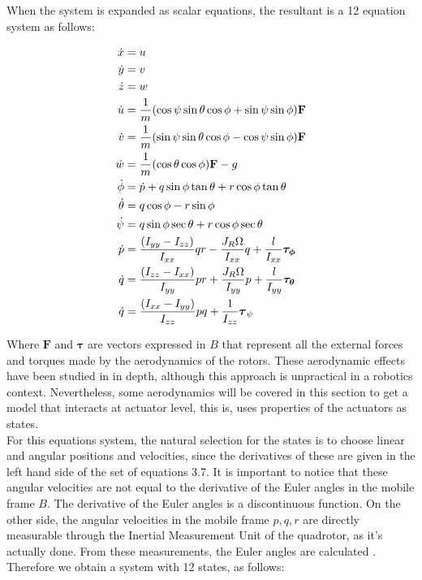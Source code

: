 When the system is expanded as scalar equations, the resultant is a 12 equation system as follows:

\begin{equation} 
\begin{subequations} \label{eq:newtonformulationexpanded}
\begin{align}
	\dot{x} &= u \label{first}\\
	\dot{y} &= v \label{second}\\
	\dot{z} &= w \label{third}\\
	\dot{u} &= \frac{1}{m}(\cos{\psi}\sin{\theta}\cos{\phi} + \sin{\psi}\sin{\phi})\mathbf{F} \label{fourth}\\
	\dot{v} &= \frac{1}{m}(\sin{\psi}\sin{\theta}\cos{\phi} - \cos{\psi}\sin{\phi})\mathbf{F} \label{fifth}\\
	\dot{w} &= \frac{1}{m}(\cos{\theta}\cos{\phi})\mathbf{F} - g\label{sixth}\\
	\dot{\phi} &= \dot{p} + q\sin{\phi}\tan{\theta} +r\cos{\phi}\tan{\theta} \label{seventh}\\
	\dot{\theta} &=  q\cos{\phi} - r\sin{\phi}\label{eighth}\\
	\dot{\psi} &= q\sin{\phi}\sec{\theta} + r\cos{\phi}\sec{\theta}\label{nineth}\\
	\dot{p} &= \frac{(I_{yy} - I_{zz})}{I_{xx}}qr - \frac{J_R\Omega}{I_{xx}}q + \frac{l}{I_{xx}}\boldsymbol{\tau_{\phi}}\label{tenth}\\
	\dot{q} &= \frac{(I_{zz} - I_{xx})}{I_{yy}}pr + \frac{J_R\Omega}{I_{yy}}p + \frac{l}{I_{yy}}\boldsymbol{\tau_{\theta}}\label{eleventh}\\
	\dot{q} &= \frac{(I_{xx} - I_{yy})}{I_{zz}}pq + \frac{1}{I_{zz}}\boldsymbol{\tau}_{\psi} \label{twelveth}\\
\end{align}
\end{subequations}
\end{equation}

Where $\mathbf{F}$ and $\boldsymbol{\tau}$ are vectors expressed in {$B$} that represent all the external forces and torques made by the aerodynamics of the rotors. These aerodynamic effects have been studied in \cite{Hoffmann2007} in depth, although this approach is unpractical in a robotics context. Nevertheless, some aerodynamics will be covered in this section to get a model that interacts at actuator level, this is, uses properties of the actuators as states. \\

For this equations system, the natural selection for the states is to choose linear and angular positions and velocities, since the derivatives of these are given in the left hand side of the set of equations 3.7. It is important to notice that these angular velocities are not equal to the derivative of the Euler angles in the mobile frame {$B$}. The derivative of the Euler angles is a discontinuous function. On the other side, the angular velocities in the mobile frame {$p, q, r$} are directly measurable through the Inertial Measurement Unit of the quadrotor, as it's actually done. From these measurements, the Euler angles are calculated \cite{Raffo2007}. Therefore we obtain a system with 12 states, as follows:


